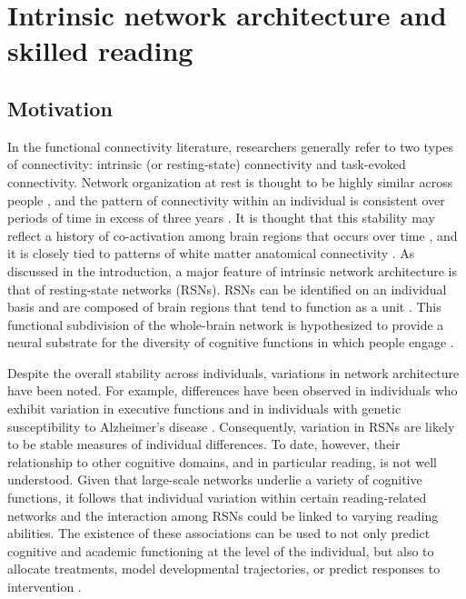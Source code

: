 \chapter{Intrinsic network architecture and skilled reading}

\section{Motivation}

In the functional connectivity literature, researchers generally refer to two types of connectivity: intrinsic (or resting-state) connectivity and task-evoked connectivity. Network organization at rest is thought to be highly similar across people \citep{Damoiseaux2006}, and the pattern of connectivity within an individual is consistent over periods of time in excess of three years \citep{Choe2015}. It is thought that this stability may reflect a history of co-activation among brain regions that occurs over time \citep{Power2010}, and it is closely tied to patterns of white matter anatomical connectivity \citep{Honey2009}. As discussed in the introduction, a major feature of intrinsic network architecture is that of resting-state networks (RSNs). RSNs can be identified on an individual basis \citep{Laumann2015} and are composed of brain regions that tend to function as a unit \citep{DeLuca2006, Smith2009}. This functional subdivision of the whole-brain network is hypothesized to provide a neural substrate for the diversity of cognitive functions in which people engage \citep{Yeo2014}.

Despite the overall stability across individuals, variations in network architecture have been noted. For example, differences have been observed in individuals who exhibit variation in executive functions \citep{Reineberg2015, Tian2015} and in individuals with genetic susceptibility to Alzheimer’s disease \citep{Trachtenberg2012}. Consequently, variation in RSNs are likely to be stable measures of individual differences. To date, however, their relationship to other cognitive domains, and in particular reading, is not well understood.  Given that large-scale networks underlie a variety of cognitive functions, it follows that individual variation within certain reading-related networks and the interaction among RSNs could be linked to varying reading abilities. The existence of these associations can be used to not only predict cognitive and academic functioning at the level of the individual, but also to allocate treatments, model developmental trajectories, or predict  responses to intervention \citep{Mattfeld2014, Crowther2015, Whitfield-Gabrieli2016}. 

